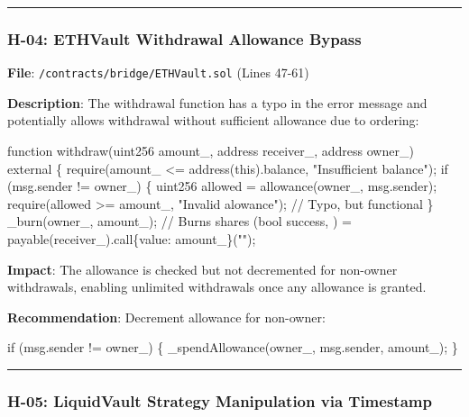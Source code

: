 \documentclass[
]{article}
\newenvironment{Shaded}{}{}
\newcommand{\NormalTok}[1]{#1}
\begin{document}
\begin{center}\rule{0.5\linewidth}{0.5pt}\end{center}

\subsubsection{H-04: ETHVault Withdrawal Allowance
Bypass}\label{h-04-ethvault-withdrawal-allowance-bypass}

\textbf{File}: \texttt{/contracts/bridge/ETHVault.sol} (Lines 47-61)

\textbf{Description}: The withdrawal function has a typo in the error
message and potentially allows withdrawal without sufficient allowance
due to ordering:

\begin{Shaded}
\begin{Highlighting}[]
\NormalTok{function withdraw(uint256 amount\_, address receiver\_, address owner\_) external \{}
\NormalTok{    require(amount\_ \textless{}= address(this).balance, "Insufficient balance");}
\NormalTok{    if (msg.sender != owner\_) \{}
\NormalTok{        uint256 allowed = allowance(owner\_, msg.sender);}
\NormalTok{        require(allowed \textgreater{}= amount\_, "Invalid alowance");  // Typo, but functional}
\NormalTok{    \}}
\NormalTok{    \_burn(owner\_, amount\_);  // Burns shares}
\NormalTok{    (bool success, ) = payable(receiver\_).call\{value: amount\_\}("");}
\end{Highlighting}
\end{Shaded}

\textbf{Impact}: The allowance is checked but not decremented for
non-owner withdrawals, enabling unlimited withdrawals once any allowance
is granted.

\textbf{Recommendation}: Decrement allowance for non-owner:

\begin{Shaded}
\begin{Highlighting}[]
\NormalTok{if (msg.sender != owner\_) \{}
\NormalTok{    \_spendAllowance(owner\_, msg.sender, amount\_);}
\NormalTok{\}}
\end{Highlighting}
\end{Shaded}

\begin{center}\rule{0.5\linewidth}{0.5pt}\end{center}

\subsubsection{H-05: LiquidVault Strategy Manipulation via
Timestamp}\label{h-05-liquidvault-strategy-manipulation-via-timestamp}
\end{document}
